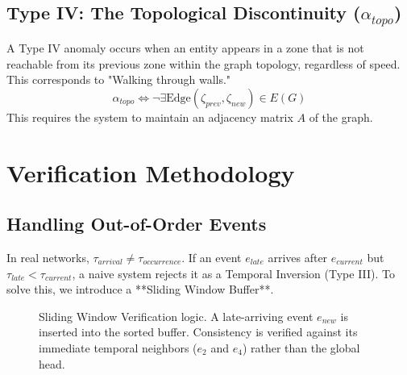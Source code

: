 \documentclass[conference]{IEEEtran}
\begin{document}
\subsection{Type IV: The Topological Discontinuity ($\alpha_{topo}$)}
A Type IV anomaly occurs when an entity appears in a zone that is not reachable from its previous zone within the graph topology, regardless of speed. This corresponds to "Walking through walls."
\begin{equation}
\alpha_{topo} \iff \neg \exists \text{Edge}(\zeta_{prev}, \zeta_{new}) \in E(G)
\end{equation}
This requires the system to maintain an adjacency matrix $A$ of the graph.

\section{Verification Methodology}

\subsection{Handling Out-of-Order Events}
In real networks, $\tau_{arrival} \neq \tau_{occurrence}$. If an event $e_{late}$ arrives after $e_{current}$ but $\tau_{late} < \tau_{current}$, a naive system rejects it as a Temporal Inversion (Type III). To solve this, we introduce a **Sliding Window Buffer**.

\begin{figure}[htbp]
\centering
{}
\caption{Sliding Window Verification logic. A late-arriving event $e_{new}$ is inserted into the sorted buffer. Consistency is verified against its immediate temporal neighbors ($e_2$ and $e_4$) rather than the global head.}
\label{fig:window}
\end{figure}
\end{document}
